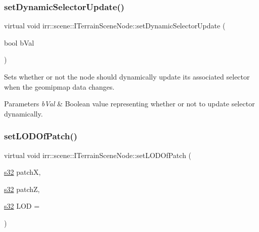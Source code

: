 \subsubsection{\texorpdfstring{set\+Dynamic\+Selector\+Update()}{setDynamicSelectorUpdate()}\hspace{0.1cm}{\footnotesize\ttfamily [2/2]}}
{\footnotesize\ttfamily virtual void irr\+::scene\+::\+I\+Terrain\+Scene\+Node\+::set\+Dynamic\+Selector\+Update (\begin{DoxyParamCaption}\item[{bool}]{b\+Val }\end{DoxyParamCaption})\hspace{0.3cm}{\ttfamily [pure virtual]}}



Sets whether or not the node should dynamically update its associated selector when the geomipmap data changes. 


\begin{DoxyParams}{Parameters}
{\em b\+Val} & Boolean value representing whether or not to update selector dynamically. \\
\hline
\end{DoxyParams}
\mbox{\label{classirr_1_1scene_1_1ITerrainSceneNode_a41b7f1ee70511d648cc11217347160ad}} 
\subsubsection{\texorpdfstring{set\+L\+O\+D\+Of\+Patch()}{setLODOfPatch()}\hspace{0.1cm}{\footnotesize\ttfamily [1/2]}}
{\footnotesize\ttfamily virtual void irr\+::scene\+::\+I\+Terrain\+Scene\+Node\+::set\+L\+O\+D\+Of\+Patch (\begin{DoxyParamCaption}\item[{\hyperlink{namespaceirr_ac66849b7a6ed16e30ebede579f9b47c6}{s32}}]{patchX,  }\item[{\hyperlink{namespaceirr_ac66849b7a6ed16e30ebede579f9b47c6}{s32}}]{patchZ,  }\item[{\hyperlink{namespaceirr_ac66849b7a6ed16e30ebede579f9b47c6}{s32}}]{L\+OD = {} }\end{DoxyParamCaption})\hspace{0.3cm}{\ttfamily [pure virtual]}}




